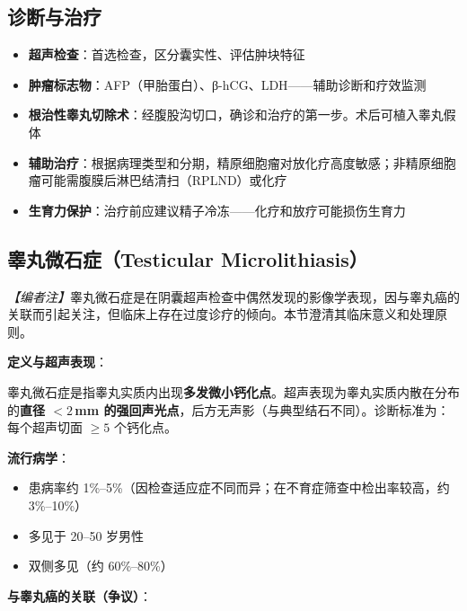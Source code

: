 \begin{enumerate}
\subsection{诊断与治疗}

\begin{itemize}[leftmargin=2cm]
	\item \textbf{超声检查}：首选检查，区分囊实性、评估肿块特征
	\item \textbf{肿瘤标志物}：AFP（甲胎蛋白）、β-hCG、LDH——辅助诊断和疗效监测
	\item \textbf{根治性睾丸切除术}：经腹股沟切口，确诊和治疗的第一步。术后可植入睾丸假体
	\item \textbf{辅助治疗}：根据病理类型和分期，精原细胞瘤对放化疗高度敏感；非精原细胞瘤可能需腹膜后淋巴结清扫（RPLND）或化疗
	\item \textbf{生育力保护}：治疗前应建议精子冷冻——化疗和放疗可能损伤生育力
\end{itemize}

\subsection{睾丸微石症（Testicular Microlithiasis）}
\label{subsec:microlithiasis}

\noindent\textit{【编者注】}睾丸微石症是在阴囊超声检查中偶然发现的影像学表现，因与睾丸癌的关联而引起关注，但临床上存在过度诊疗的倾向。本节澄清其临床意义和处理原则。

\vspace{0.5em}
\noindent\textbf{定义与超声表现}：

睾丸微石症是指睾丸实质内出现\textbf{多发微小钙化点}。超声表现为睾丸实质内散在分布的\textbf{直径 $<2\,$mm 的强回声光点}，后方无声影（与典型结石不同）。诊断标准为：每个超声切面 $\geq 5$ 个钙化点。

\vspace{0.5em}
\noindent\textbf{流行病学}：
\begin{itemize}[leftmargin=2cm]
	\item 患病率约 1\%--5\%（因检查适应症不同而异；在不育症筛查中检出率较高，约 3\%--10\%）
	\item 多见于 20--50 岁男性
	\item 双侧多见（约 60\%--80\%）
\end{itemize}

\vspace{0.5em}
\noindent\textbf{与睾丸癌的关联（争议）}：


\end{enumerate}
